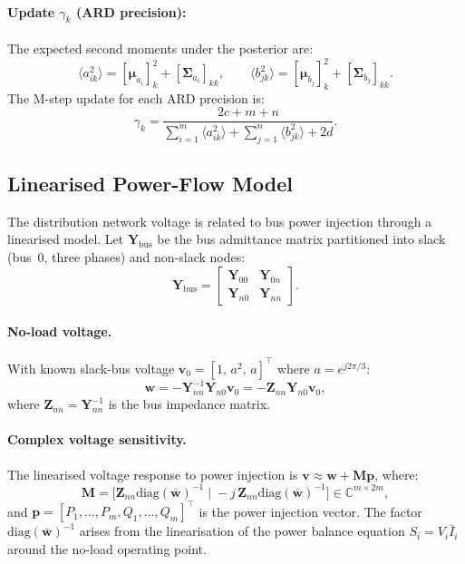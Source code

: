 \documentclass[11pt,a4paper]{article}
\newcommand{\diag}{\mathrm{diag}}
\begin{document}
\paragraph{Update $\gamma_k$ (ARD precision):}
The expected second moments under the posterior are:
\begin{equation}
  \langle a_{ik}^2 \rangle = [\bm{\mu}_{a_i}]_k^2 + [\bm{\Sigma}_{a_i}]_{kk}, \qquad
  \langle b_{jk}^2 \rangle = [\bm{\mu}_{b_j}]_k^2 + [\bm{\Sigma}_{b_j}]_{kk}.
\end{equation}
The M-step update for each ARD precision is:
\begin{equation}\label{eq:gamma_update}
  \gamma_k = \frac{2c + m + n}
  {\displaystyle \sum_{i=1}^{m} \langle a_{ik}^2 \rangle
  + \sum_{j=1}^{n} \langle b_{jk}^2 \rangle + 2d}.
\end{equation}

\subsection{Linearised Power-Flow Model}
\label{sec:pf_model}
The distribution network voltage is related to bus power injection through a linearised model. Let $\bm{Y}_{\text{bus}}$ be the bus admittance matrix partitioned into slack (bus~0, three phases) and non-slack nodes:
\begin{equation}
  \bm{Y}_{\text{bus}} = \begin{bmatrix} \bm{Y}_{00} & \bm{Y}_{0n} \\ \bm{Y}_{n0} & \bm{Y}_{nn} \end{bmatrix}.
\end{equation}

\paragraph{No-load voltage.} With known slack-bus voltage $\bm{v}_0 = [1,\, a^2,\, a]^\top$ where $a = e^{j2\pi/3}$:
\begin{equation}\label{eq:w}
  \bm{w} = -\bm{Y}_{nn}^{-1}\bm{Y}_{n0}\bm{v}_0 = -\bm{Z}_{nn}\bm{Y}_{n0}\bm{v}_0,
\end{equation}
where $\bm{Z}_{nn} = \bm{Y}_{nn}^{-1}$ is the bus impedance matrix.

\paragraph{Complex voltage sensitivity.} The linearised voltage response to power injection is $\bm{v} \approx \bm{w} + \bm{M}\bm{p}$, where:
\begin{equation}\label{eq:M}
  \bm{M} = \bigl[\bm{Z}_{nn}\diag(\bar{\bm{w}})^{-1}\;\big|\; -j\,\bm{Z}_{nn}\diag(\bar{\bm{w}})^{-1}\bigr] \in \mathbb{C}^{m \times 2m},
\end{equation}
and $\bm{p} = [P_1,\dots,P_m, Q_1,\dots,Q_m]^\top$ is the power injection vector. The factor $\diag(\bar{\bm{w}})^{-1}$ arises from the linearisation of the power balance equation $S_i = V_i \bar{I}_i$ around the no-load operating point.
\end{document}
